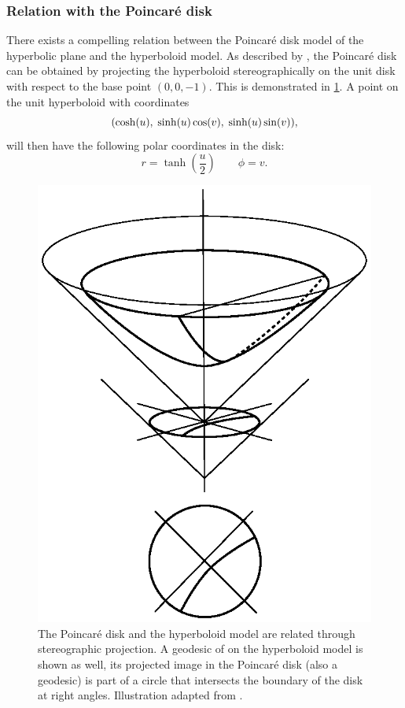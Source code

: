 \subsubsection{Relation with the Poincaré disk}
There exists a compelling relation between the Poincaré disk model of the hyperbolic plane and the hyperboloid model. As described by \citet{Balazs1986}, the Poincaré disk can be obtained by projecting the hyperboloid stereographically on the unit disk with respect to the base point $(0, 0, -1)$. This is demonstrated in \cref{fig:hyperboloid_disk}. A point on the unit hyperboloid with coordinates
$$ \qty(\cosh(u),\;\sinh(u)\cos(v),\;\sinh(u)\sin(v)), $$
will then have the following polar coordinates in the disk:
$$ r = \tanh(\frac{u}{2}) \qquad \phi = v.$$
\begin{figure}[ht]
    \centering
    \includegraphics{media/vector/hyperboloid_projection.eps}
    \caption{The Poincaré disk and the hyperboloid model are related through stereographic projection. A geodesic of on the hyperboloid model is shown as well, its projected image in the Poincaré disk (also a geodesic) is part of a circle that intersects the boundary of the disk at right angles. Illustration adapted from \citet{Balazs1986}.}
    \label{fig:hyperboloid_disk}
\end{figure}


